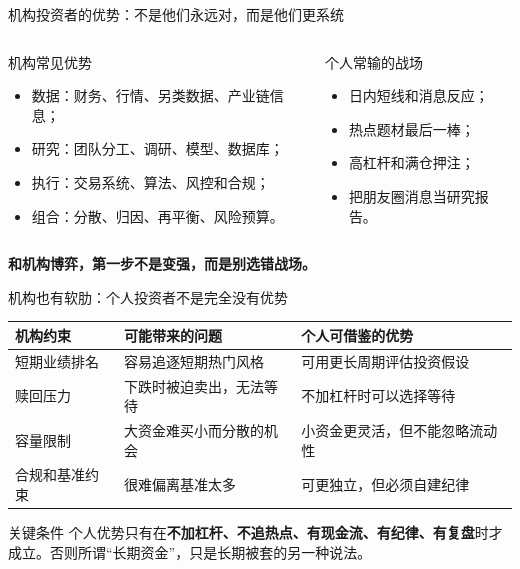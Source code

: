 \documentclass[UTF8,aspectratio=169,11pt]{ctexbeamer}
\begin{document}
\begin{frame}{机构投资者的优势：不是他们永远对，而是他们更系统}
\begin{columns}[T,totalwidth=\textwidth]
\begin{keybox}{机构常见优势}
\small
\begin{itemize}
\item 数据：财务、行情、另类数据、产业链信息；
\item 研究：团队分工、调研、模型、数据库；
\item 执行：交易系统、算法、风控和合规；
\item 组合：分散、归因、再平衡、风险预算。
\end{itemize}
\end{keybox}
\begin{riskbox}{个人常输的战场}
\small
\begin{itemize}
\item 日内短线和消息反应；
\item 热点题材最后一棒；
\item 高杠杆和满仓押注；
\item 把朋友圈消息当研究报告。
\end{itemize}
\end{riskbox}
\end{columns}
\vspace{0.25cm}
\begin{center}\Large \textbf{和机构博弈，第一步不是变强，而是别选错战场。}\end{center}
\end{frame}

\begin{frame}{机构也有软肋：个人投资者不是完全没有优势}
\begin{tabularx}{\textwidth}{p{3.0cm}X X}
\toprule
\textbf{机构约束} & \textbf{可能带来的问题} & \textbf{个人可借鉴的优势} \\
\midrule
短期业绩排名 & 容易追逐短期热门风格 & 可用更长周期评估投资假设 \\
赎回压力 & 下跌时被迫卖出，无法等待 & 不加杠杆时可以选择等待 \\
容量限制 & 大资金难买小而分散的机会 & 小资金更灵活，但不能忽略流动性 \\
合规和基准约束 & 很难偏离基准太多 & 可更独立，但必须自建纪律 \\
\bottomrule
\end{tabularx}
\vspace{0.25cm}
\begin{casebox}{关键条件}
个人优势只有在\textbf{不加杠杆、不追热点、有现金流、有纪律、有复盘}时才成立。否则所谓“长期资金”，只是长期被套的另一种说法。
\end{casebox}
\end{frame}
\end{document}
